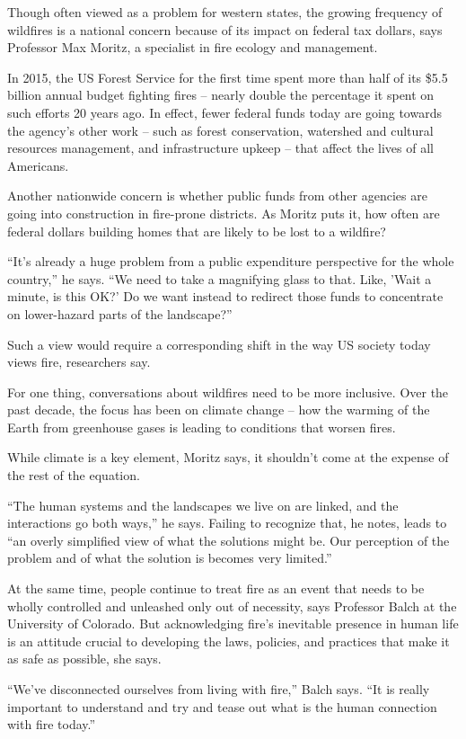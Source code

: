 Though often viewed as a problem for western states, the growing frequency of wildfires is a national concern because of its impact on federal tax dollars, says Professor Max Moritz, a specialist in fire ecology and management.


In 2015, the US Forest Service for the first time spent more than half of its \$5.5 billion annual budget fighting fires – nearly double the percentage it spent on such efforts 20 years ago. In effect, fewer federal funds today are going towards the agency's other work – such as forest conservation, watershed and cultural resources management, and infrastructure upkeep – that affect the lives of all Americans.


Another nationwide concern is whether public funds from other agencies are going into construction in fire-prone districts. As Moritz puts it, how often are federal dollars building homes that are likely to be lost to a wildfire?


``It's already a huge problem from a public expenditure perspective for the whole country,'' he says. ``We need to take a magnifying glass to that. Like, 'Wait a minute, is this OK?' Do we want instead to redirect those funds to concentrate on lower-hazard parts of the landscape?''


Such a view would require a corresponding shift in the way US society today views fire, researchers say.


For one thing, conversations about wildfires need to be more inclusive. Over the past decade, the focus has been on climate change – how the warming of the Earth from greenhouse gases is leading to conditions that worsen fires.


While climate is a key element, Moritz says, it shouldn't come at the expense of the rest of the equation.


``The human systems and the landscapes we live on are linked, and the interactions go both ways,'' he says. Failing to recognize that, he notes, leads to ``an overly simplified view of what the solutions might be. Our perception of the problem and of what the solution is becomes very limited.''


At the same time, people continue to treat fire as an event that needs to be wholly controlled and unleashed only out of necessity, says Professor Balch at the University of Colorado. But acknowledging fire's inevitable presence in human life is an attitude crucial to developing the laws, policies, and practices that make it as safe as possible, she says.


``We've disconnected ourselves from living with fire,'' Balch says. ``It is really important to understand and try and tease out what is the human connection with fire today.''